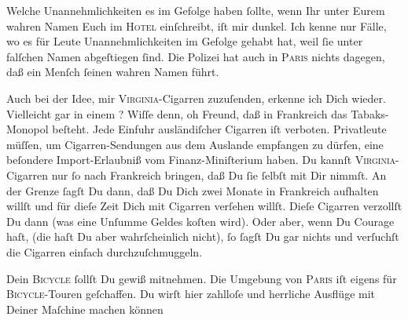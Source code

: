 \pstart
           Welche Unannehmlichkeiten es im Gefolge haben{ }ſollte, wenn Ihr unter Eurem wahren
               Namen Euch im \textsc{Hotel} einſchreibt, iſt mir dunkel. Ich kenne
               nur Fälle, wo es für Leute {\pb} Unannehmlichkeiten im Gefolge gehabt hat, weil{ }ſie unter falſchen Namen
               abgeſtiegen{ }ſind. Die Polizei hat auch in \textsc{Paris} nichts dagegen, daß ein Menſch{ }ſeinen wahren Namen führt.\pend
           
\pstart
           Auch bei der Idee, mir \textsc{Virginia}-Cigarren zuzuſenden,
               erkenne ich Dich wieder. Vielleicht gar in einem \label{K_L02806-2v}\label{K_L02806-2}? Wiſſe denn, oh Freund, daß in Frankreich
               das Tabaks-Monopol beſteht. Jede Einfuhr 
               ausländiſcher Cigarren iſt verboten. Privatleute müſſen, um Cigarren-Sendungen  aus dem {\pb}Auslande
               empfangen zu dürfen, eine beſondere Import-Erlaubniß vom Finanz-Miniſterium haben. Du kannſt \textsc{Virginia}-Cigarren nur{ }ſo nach Frankreich
               bringen, daß Du{ }ſie{ }ſelbſt mit Dir nimmſt. An der Grenze{ }ſagſt Du dann, daß Du Dich
               zwei Monate in Frankreich aufhalten willſt und
               für dieſe Zeit Dich mit Cigarren verſehen willſt. Dieſe Cigarren verzollſt Du dann
               (was eine Unſumme  Geldes koſten wird). Oder aber,
               wenn Du Courage haſt, (die haſt Du aber wahrſcheinlich nicht), {\pb}ſo{ }ſagſt Du gar nichts und verſuchſt die Cigarren
               einfach durchzuſchmuggeln.\pend
           
\pstart
           Dein \textsc{Bicycle}{ }ſollſt Du gewiß mitnehmen. Die Umgebung von
                  \textsc{Paris} iſt eigens für \textsc{Bicycle}-Touren geſchaffen. Du wirſt
               hier zahlloſe und herrliche Ausflüge mit Deiner Maſchine machen können{\dotsfive}\pend
           
